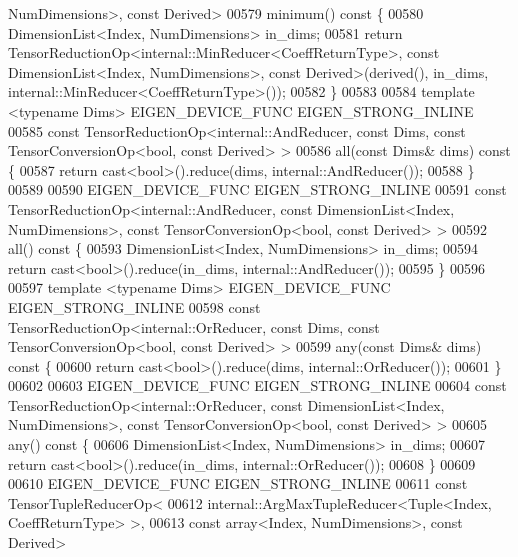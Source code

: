 \begin{DoxyCode}
       NumDimensions>, \textcolor{keyword}{const} Derived>
00579     minimum()\textcolor{keyword}{ const }\{
00580       DimensionList<Index, NumDimensions> in\_dims;
00581       \textcolor{keywordflow}{return} TensorReductionOp<internal::MinReducer<CoeffReturnType>, \textcolor{keyword}{const} DimensionList<Index,
       NumDimensions>, \textcolor{keyword}{const} Derived>(derived(), in\_dims, internal::MinReducer<CoeffReturnType>());
00582     \}
00583 
00584     \textcolor{keyword}{template} <\textcolor{keyword}{typename} Dims> EIGEN\_DEVICE\_FUNC EIGEN\_STRONG\_INLINE
00585     \textcolor{keyword}{const} TensorReductionOp<internal::AndReducer, const Dims, const TensorConversionOp<bool, const Derived>
       >
00586     all(\textcolor{keyword}{const} Dims& dims)\textcolor{keyword}{ const }\{
00587       \textcolor{keywordflow}{return} cast<bool>().reduce(dims, internal::AndReducer());
00588     \}
00589 
00590     EIGEN\_DEVICE\_FUNC EIGEN\_STRONG\_INLINE
00591     \textcolor{keyword}{const} TensorReductionOp<internal::AndReducer, const DimensionList<Index, NumDimensions>, \textcolor{keyword}{const} 
      TensorConversionOp<bool, const Derived> >
00592     all()\textcolor{keyword}{ const }\{
00593       DimensionList<Index, NumDimensions> in\_dims;
00594       \textcolor{keywordflow}{return} cast<bool>().reduce(in\_dims, internal::AndReducer());
00595     \}
00596 
00597     \textcolor{keyword}{template} <\textcolor{keyword}{typename} Dims> EIGEN\_DEVICE\_FUNC EIGEN\_STRONG\_INLINE
00598     \textcolor{keyword}{const} TensorReductionOp<internal::OrReducer, const Dims, const TensorConversionOp<bool, const Derived> 
      >
00599     any(\textcolor{keyword}{const} Dims& dims)\textcolor{keyword}{ const }\{
00600       \textcolor{keywordflow}{return} cast<bool>().reduce(dims, internal::OrReducer());
00601     \}
00602 
00603     EIGEN\_DEVICE\_FUNC EIGEN\_STRONG\_INLINE
00604     \textcolor{keyword}{const} TensorReductionOp<internal::OrReducer, const DimensionList<Index, NumDimensions>, \textcolor{keyword}{const} 
      TensorConversionOp<bool, const Derived> >
00605     any()\textcolor{keyword}{ const }\{
00606       DimensionList<Index, NumDimensions> in\_dims;
00607       \textcolor{keywordflow}{return} cast<bool>().reduce(in\_dims, internal::OrReducer());
00608     \}
00609 
00610    EIGEN\_DEVICE\_FUNC EIGEN\_STRONG\_INLINE
00611     \textcolor{keyword}{const} TensorTupleReducerOp<
00612       internal::ArgMaxTupleReducer<Tuple<Index, CoeffReturnType> >,
00613       \textcolor{keyword}{const} array<Index, NumDimensions>, \textcolor{keyword}{const} Derived>

\end{DoxyCode}
